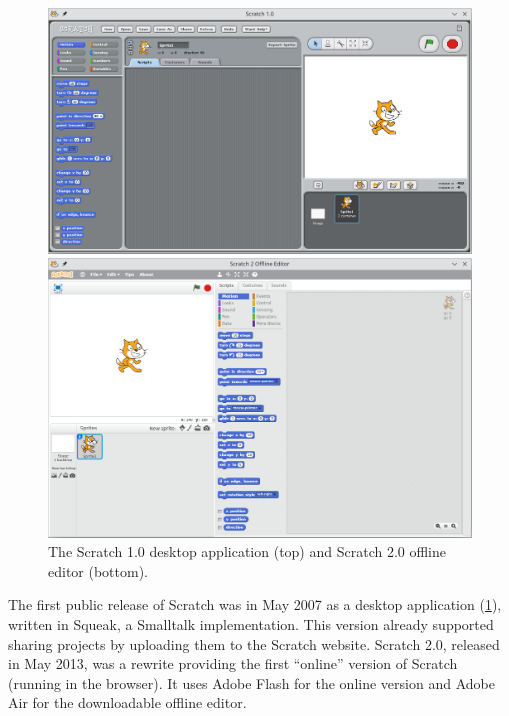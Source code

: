 \documentclass[../main]{subfiles}
\begin{document}
\begin{figure}
    \begin{wide}
        \includegraphics[width=\linewidth]{scratch-1}

        \vspace{1em}
        \includegraphics[width=\linewidth]{scratch-2}
    \end{wide}
    \caption{The Scratch 1.0 desktop application (top) and Scratch 2.0 offline editor (bottom).}
    \label{fig:scratch-1.0}
\end{figure}


The first public release of Scratch was in May 2007 as a desktop application (\cref{fig:scratch-1.0}), written in Squeak, a Smalltalk implementation.
This version already supported sharing projects by uploading them to the Scratch website.
Scratch 2.0, released in May 2013, was a rewrite providing the first ``online'' version of Scratch (running in the browser).
It uses Adobe Flash for the online version and Adobe Air for the downloadable offline editor.
\end{document}
